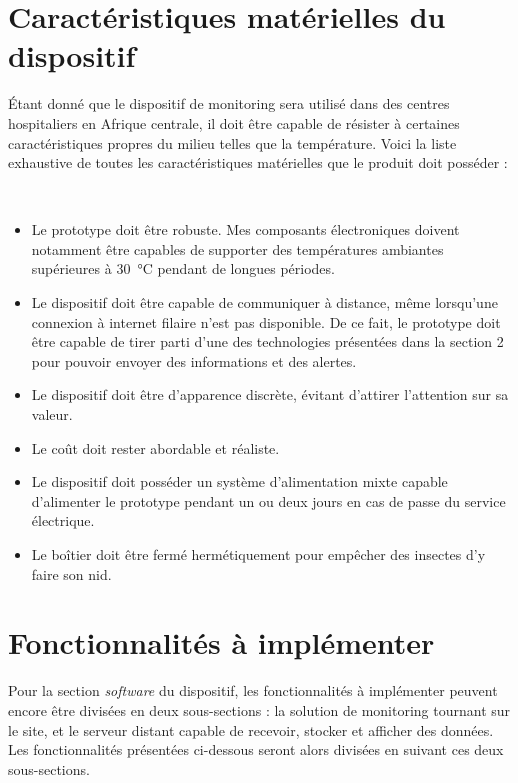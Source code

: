 \section{Caractéristiques matérielles du dispositif}
\label{sec:cahier_proto}

Étant donné que le dispositif de monitoring sera utilisé dans des centres hospitaliers en Afrique centrale, il doit être capable de résister à certaines caractéristiques propres du milieu telles que la température. Voici la liste exhaustive de toutes les caractéristiques matérielles que le produit doit posséder :

~


\begin{itemize}
  \item Le prototype doit être robuste. Mes composants électroniques doivent notamment être capables de supporter des températures ambiantes supérieures à \SI{30}{\celsius} pendant de longues périodes. \cite{temperature_kinshasa}

  \item Le dispositif doit être capable de communiquer à distance, même lorsqu'une connexion à internet filaire n'est pas disponible. De ce fait, le prototype doit être capable de tirer parti d'une des technologies présentées dans la section 2 pour pouvoir envoyer des informations et des alertes.

  \item Le dispositif doit être d'apparence discrète, évitant d'attirer l'attention sur sa valeur.

  \item Le coût doit rester abordable et réaliste.

  \item Le dispositif doit posséder un système d'alimentation mixte capable d'alimenter le prototype pendant un ou deux jours en cas de passe du service électrique.

  \item Le boîtier doit être fermé hermétiquement pour empêcher des insectes d'y faire son nid.
\end{itemize}



\section{Fonctionnalités à implémenter}
\label{sec:cahier_soft}

Pour la section \textit{software} du dispositif, les fonctionnalités à implémenter peuvent encore être divisées en deux sous-sections : la solution de monitoring tournant sur le site, et le serveur distant capable de recevoir, stocker et afficher des données. Les fonctionnalités présentées ci-dessous seront alors divisées en suivant ces deux sous-sections.


